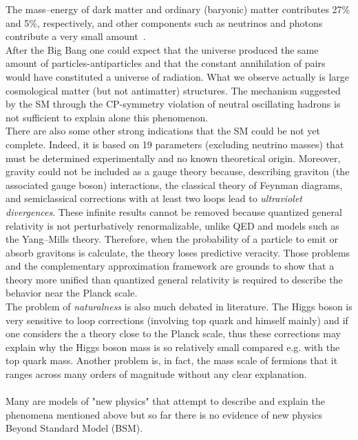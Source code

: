 The mass–energy of dark matter and ordinary (baryonic) matter contributes 27\% and 5\%, respectively, and other components 
such as neutrinos and photons contribute a very small amount~\cite{plank}. 
\vspace{\baselineskip}
\\After the Big Bang one could expect that the universe produced the same amount of particles-antiparticles and that the constant annihilation
of pairs would have constituted a universe of radiation. What we observe actually is large cosmological matter (but not antimatter) structures.
The mechanism suggested by the SM through the CP-symmetry violation of neutral oscillating hadrons is not sufficient to explain alone this phenomenon.
\vspace{\baselineskip}
\\There are also some other strong indications that the SM could be not yet complete. Indeed, it is based on 19 parameters (excluding neutrino masses)
that must be determined experimentally and no known theoretical origin.  Moreover, gravity could not be included as a gauge theory because, 
describing graviton (the associated gauge boson) interactions, the classical theory of  Feynman diagrams, and semiclassical corrections with 
at least two loops lead to \textit{ultraviolet divergences}. These infinite results cannot be removed 
because quantized general relativity is not perturbatively renormalizable, unlike QED and models such as the Yang–Mills theory. 
Therefore, when the probability of a particle to emit or absorb gravitons is calculate, the theory loses predictive veracity. 
Those problems and the complementary approximation framework are grounds to show that a theory more unified than quantized general relativity is 
required to describe the behavior near the Planck scale. 
\vspace{\baselineskip}
\\The problem of \textit{naturalness} is also much debated in literature. The Higgs boson is very sensitive to loop corrections (involving top quark and himself
mainly) and if one considers the a theory close to the Planck scale, thus these corrections may explain why the Higgs boson mass is so relatively small compared
e.g. with the top quark mass. Another problem is, in fact, the mass scale of fermions that it ranges across many orders of magnitude without any clear explanation.\\
\vspace{\baselineskip}
\\Many are models of "new physics" that attempt to describe and explain the phenomena mentioned above but so far there is no evidence of new physics Beyond Standard Model (BSM). 
